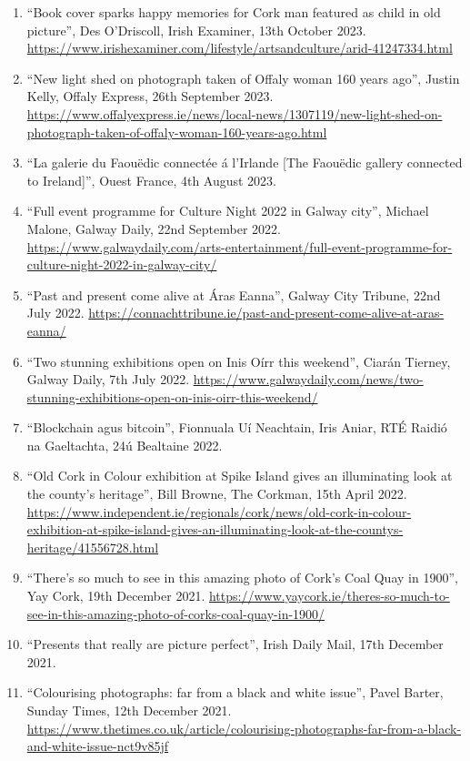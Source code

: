 \documentclass[10pt,a4paper]{res} %
\begin{document}
\begin{resume}
{\begin{enumerate}
\item ``Book cover sparks happy memories for Cork man featured as child in old picture'', Des O'Driscoll, Irish Examiner, 13th October 2023. \url{https://www.irishexaminer.com/lifestyle/artsandculture/arid-41247334.html}
\item ``New light shed on photograph taken of Offaly woman 160 years ago'', Justin Kelly, Offaly Express, 26th September 2023. \url{https://www.offalyexpress.ie/news/local-news/1307119/new-light-shed-on-photograph-taken-of-offaly-woman-160-years-ago.html}
\item ``La gale­rie du Faou\"{e}dic connec­t\'{e}e \'{a} l'Irlande [The Faou\"{e}dic gallery connected to Ireland]'', Ouest France, 4th August 2023.
\item ``Full event programme for Culture Night 2022 in Galway city'', Michael Malone, Galway Daily, 22nd September 2022. \url{https://www.galwaydaily.com/arts-entertainment/full-event-programme-for-culture-night-2022-in-galway-city/}
\item ``Past and present come alive at \'{A}ras Eanna'', Galway City Tribune, 22nd July 2022. \url{https://connachttribune.ie/past-and-present-come-alive-at-aras-eanna/}
\item ``Two stunning exhibitions open on Inis O\'{i}rr this weekend'', Ciar\'{a}n Tierney, Galway Daily, 7th July 2022. \url{https://www.galwaydaily.com/news/two-stunning-exhibitions-open-on-inis-oirr-this-weekend/}
\item ``Blockchain agus bitcoin'', Fionnuala U\'{i} Neachtain, Iris Aniar, RT\'{E} Raidi\'{o} na Gaeltachta, 24\'{u} Bealtaine 2022.
\item ``Old Cork in Colour exhibition at Spike Island gives an illuminating look at the county's heritage'', Bill Browne, The Corkman, 15th April 2022. \url{https://www.independent.ie/regionals/cork/news/old-cork-in-colour-exhibition-at-spike-island-gives-an-illuminating-look-at-the-countys-heritage/41556728.html}
\item ``There's so much to see in this amazing photo of Cork's Coal Quay in 1900'', Yay Cork, 19th December 2021. \url{https://www.yaycork.ie/theres-so-much-to-see-in-this-amazing-photo-of-corks-coal-quay-in-1900/}
\item ``Presents that really are picture perfect'', Irish Daily Mail, 17th December 2021.
\item ``Colourising photographs: far from a black and white issue'', Pavel Barter, Sunday Times, 12th December 2021. \url{https://www.thetimes.co.uk/article/colourising-photographs-far-from-a-black-and-white-issue-nct9v85jf}

\end{enumerate}}
\end{resume}
\end{document}
